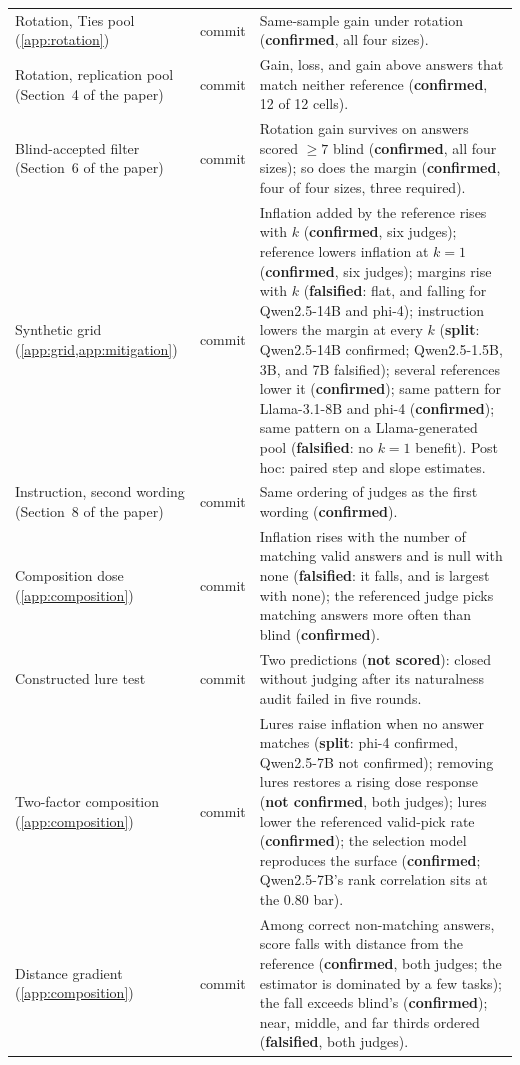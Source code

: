 {\begin{longtable}{L{3.2cm}L{1.1cm}L{8.7cm}}
Rotation, Ties pool (\cref{app:rotation}) & commit & Same-sample gain under rotation (\textbf{confirmed}, all four sizes). \\
Rotation, replication pool (Section~4 of the paper) & commit & Gain, loss, and gain above answers that match neither reference (\textbf{confirmed}, 12 of 12 cells). \\
Blind-accepted filter (Section~6 of the paper) & commit & Rotation gain survives on answers scored $\geq 7$ blind (\textbf{confirmed}, all four sizes); so does the margin (\textbf{confirmed}, four of four sizes, three required). \\
Synthetic grid (\cref{app:grid,app:mitigation}) & commit & Inflation added by the reference rises with $k$ (\textbf{confirmed}, six judges); reference lowers inflation at $k{=}1$ (\textbf{confirmed}, six judges); margins rise with $k$ (\textbf{falsified}: flat, and falling for Qwen2.5-14B and phi-4); instruction lowers the margin at every $k$ (\textbf{split}: Qwen2.5-14B confirmed; Qwen2.5-1.5B, 3B, and 7B falsified); several references lower it (\textbf{confirmed}); same pattern for Llama-3.1-8B and phi-4 (\textbf{confirmed}); same pattern on a Llama-generated pool (\textbf{falsified}: no $k{=}1$ benefit). Post hoc: paired step and slope estimates. \\
Instruction, second wording (Section~8 of the paper) & commit & Same ordering of judges as the first wording (\textbf{confirmed}). \\
Composition dose (\cref{app:composition}) & commit & Inflation rises with the number of matching valid answers and is null with none (\textbf{falsified}: it falls, and is largest with none); the referenced judge picks matching answers more often than blind (\textbf{confirmed}). \\
Constructed lure test & commit & Two predictions (\textbf{not scored}): closed without judging after its naturalness audit failed in five rounds. \\
Two-factor composition (\cref{app:composition}) & commit & Lures raise inflation when no answer matches (\textbf{split}: phi-4 confirmed, Qwen2.5-7B not confirmed); removing lures restores a rising dose response (\textbf{not confirmed}, both judges); lures lower the referenced valid-pick rate (\textbf{confirmed}); the selection model reproduces the surface (\textbf{confirmed}; Qwen2.5-7B's rank correlation sits at the 0.80 bar). \\
Distance gradient (\cref{app:composition}) & commit & Among correct non-matching answers, score falls with distance from the reference (\textbf{confirmed}, both judges; the estimator is dominated by a few tasks); the fall exceeds blind's (\textbf{confirmed}); near, middle, and far thirds ordered (\textbf{falsified}, both judges). \\

\end{longtable}}
